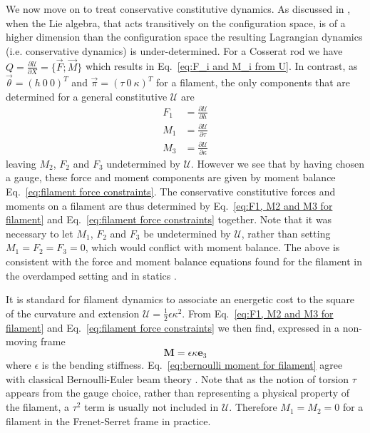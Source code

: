 We now move on to treat conservative constitutive dynamics. As discussed in \citep{levyReviewElieCartan1935}, when the Lie algebra, that acts transitively on the configuration space, is of a higher dimension than the configuration space the resulting Lagrangian dynamics (i.e. conservative dynamics) is under-determined. For a Cosserat rod we have $Q = \frac{\partial \mathcal{U}}{\partial X} = \{ \vec{F} ; \vec{M} \}$ which results in Eq.~\ref{eq:F_i and M_i from U}. In contrast, as $\vec{\theta} = (h\ 0\ 0)^T$ and $\vec{\pi} = (\tau\ 0\ \kappa)^T$ for a filament, the only components that are determined for a general constitutive $\mathcal{U}$ are
\begin{subequations} \label{eq:F1, M2 and M3 for filament}
\begin{align}
F_1 & =  \frac{\partial \mathcal{U}}{\partial h} \\
M_1 & =  \frac{\partial \mathcal{U}}{\partial \tau} \\
M_3 & =  \frac{\partial \mathcal{U}}{\partial \kappa} 
\end{align}
\end{subequations}
leaving $M_2$, $F_2$ and $F_3$ undetermined by $\mathcal{U}$. However we see that by having chosen a gauge, these force and moment components are given by moment balance Eq.~\ref{eq:filament force constraints}. The conservative constitutive forces and moments on a filament are thus determined by Eq.~\ref{eq:F1, M2 and M3 for filament} and Eq.~\ref{eq:filament force constraints} together. Note that it was necessary to let $M_1$, $F_2$ and $F_3$ be undetermined by $\mathcal{U}$, rather than setting $M_1 = F_2 = F_3 = 0$, which would conflict with moment balance. The above is consistent with the force and moment balance equations found for the filament in the overdamped setting \citep{powersDynamicsFilamentsMembranes2010} and in statics \citep{parkerDerivationNonlinearRod1984a}.

It is standard for filament dynamics to associate an energetic cost to the square of the curvature and extension $\mathcal{U} = \frac{1}{2} \epsilon \kappa^2$.  From Eq.~\ref{eq:F1, M2 and M3 for filament} and Eq.~\ref{eq:filament force constraints} we then find, expressed in a non-moving frame
\begin{equation} \label{eq:bernoulli moment for filament}
\mathbf{M} = \epsilon \kappa \mathbf{e}_3
\end{equation}
where $\epsilon$ is the bending stiffness. Eq.~\ref{eq:bernoulli moment for filament} agree with classical Bernoulli-Euler beam theory \citep{ powersDynamicsFilamentsMembranes2010, sodaDynamicsStiffChains1973, nordgrenComputationMotionElastic1974}. Note that as the notion of torsion $\tau$ appears from the gauge choice, rather than representing a physical property of the filament, a $\tau^2$ term is usually not included in $\mathcal{U}$. Therefore $M_1 = M_2 = 0$ for a filament in the Frenet-Serret frame in practice.

